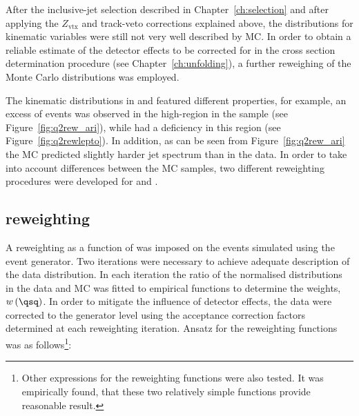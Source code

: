 After the inclusive-jet selection described in Chapter~\ref{ch:selection} and after applying the $Z_\text{vtx}$ and track-veto corrections explained above, the distributions for kinematic variables were still not very well described by MC. In order to obtain a reliable estimate of the detector effects to be corrected for in the cross section determination procedure (see Chapter~\ref{ch:unfolding}), a further reweighing of the Monte Carlo distributions was employed. 

The kinematic distributions in \lepto and \ariadne featured different properties, for example, an excess of events was observed in the high-\qsq region in the \ariadne sample (see Figure~\ref{fig:q2rew_ari}), while \lepto had a deficiency in this region (see Figure~\ref{fig:q2rewlepto}). In addition, as can be seen from Figure~\ref{fig:q2rew_ari} the \ariadne MC predicted slightly harder jet spectrum than in the data. In order to take into account differences between the MC samples, two different reweighting procedures were developed for \lepto and \ariadne.

\subsection{\lepto reweighting}
\label{subsec:leptoq2rew}
A reweighting as a function of \qsq was imposed on the events simulated using the \lepto event generator. Two iterations were necessary to achieve adequate description of the data distribution. In each iteration the ratio of the normalised \qsq distributions in the data and MC was fitted to empirical functions to determine the weights, $w\left( \qsq\right) $. In order to mitigate the influence of detector effects, the data were corrected to the generator level using the acceptance correction factors determined at each reweighting iteration. Ansatz for the reweighting functions was as follows\footnote{Other expressions for the reweighting functions were also tested. It was empirically found, that these two relatively simple functions provide reasonable result.}:

